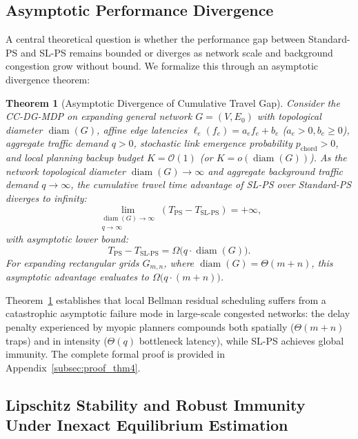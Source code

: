 \documentclass[11pt,a4paper]{article}
\newtheorem{theorem}{Theorem}
\begin{document}
\subsection{Asymptotic Performance Divergence}
\label{sec:asymptotic_analysis}

A central theoretical question is whether the performance gap between Standard-PS and SL-PS remains bounded or diverges as network scale and background congestion grow without bound. We formalize this through an asymptotic divergence theorem:

\begin{theorem}[Asymptotic Divergence of Cumulative Travel Gap]
\label{thm:asymptotic_divergence}
Consider the CC-DG-MDP on expanding general network $G = (V, E_0)$ with topological diameter $\operatorname{diam}(G)$, affine edge latencies $\ell_e(f_e) = a_e f_e + b_e$ ($a_e > 0, b_e \ge 0$), aggregate traffic demand $q > 0$, stochastic link emergence probability $p_{\text{chord}} > 0$, and local planning backup budget $K = \mathcal{O}(1)$ (or $K = o(\operatorname{diam}(G))$).
As the network topological diameter $\operatorname{diam}(G) \to \infty$ and aggregate background traffic demand $q \to \infty$, the cumulative travel time advantage of SL-PS over Standard-PS diverges to infinity:
\begin{equation}
\label{eq:asymptotic_divergence}
\lim_{\substack{\operatorname{diam}(G) \to \infty \\ q \to \infty}} \left( T_{\text{PS}} - T_{\text{SL-PS}} \right) = +\infty,
\end{equation}
with asymptotic lower bound:
\begin{equation}
T_{\text{PS}} - T_{\text{SL-PS}} = \Omega\big(q \cdot \operatorname{diam}(G)\big).
\end{equation}
For expanding rectangular grids $G_{m,n}$, where $\operatorname{diam}(G) = \Theta(m + n)$, this asymptotic advantage evaluates to $\Omega\big(q \cdot (m + n)\big)$.
\end{theorem}

Theorem~\ref{thm:asymptotic_divergence} establishes that local Bellman residual scheduling suffers from a catastrophic asymptotic failure mode in large-scale congested networks: the delay penalty experienced by myopic planners compounds both spatially ($\Theta(m+n)$ traps) and in intensity ($\Theta(q)$ bottleneck latency), while SL-PS achieves global immunity. The complete formal proof is provided in Appendix~\ref{subsec:proof_thm4}.

\subsection{Lipschitz Stability and Robust Immunity Under Inexact Equilibrium Estimation}
\label{subsec:lipschitz_stability}
\end{document}

